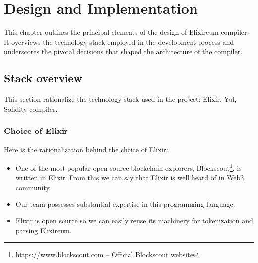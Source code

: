 \chapter{Design and Implementation}
\label{chap:impl}








This chapter outlines the principal elements of the design of Elixireum compiler. It overviews the technology stack employed in the development process and underscores the pivotal decisions that shaped the architecture of the compiler.


\section{Stack overview}
\label{sec:architecture}
This section rationalize the technology stack used in the project: Elixir, Yul, Solidity compiler.
\subsection{Choice of Elixir}
Here is the rationalization behind the choice of Elixir:
\begin{itemize}
    \item One of the most popular open source blockchain explorers, Blockscout\footnote{\href{https://www.blockscout.com/}{https://www.blockscout.com} -- Official Blockscout website}, is written in Elixir. From this we can say that Elixir is well heard of in Web3 community.
    \item Our team possesses substantial expertise in this programming language.
    \item Elixir is open source so we can easily reuse its machinery for tokenization and parsing Elixireum.
\end{itemize}

